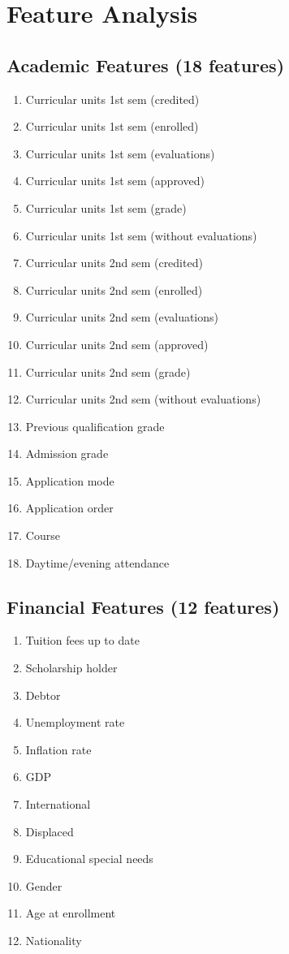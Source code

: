 \section{Feature Analysis}
\label{sec:feature_analysis}

\subsection{Academic Features (18 features)}

\begin{enumerate}
    \item Curricular units 1st sem (credited)
    \item Curricular units 1st sem (enrolled)
    \item Curricular units 1st sem (evaluations)
    \item Curricular units 1st sem (approved)
    \item Curricular units 1st sem (grade)
    \item Curricular units 1st sem (without evaluations)
    \item Curricular units 2nd sem (credited)
    \item Curricular units 2nd sem (enrolled)
    \item Curricular units 2nd sem (evaluations)
    \item Curricular units 2nd sem (approved)
    \item Curricular units 2nd sem (grade)
    \item Curricular units 2nd sem (without evaluations)
    \item Previous qualification grade
    \item Admission grade
    \item Application mode
    \item Application order
    \item Course
    \item Daytime/evening attendance
\end{enumerate}

\subsection{Financial Features (12 features)}

\begin{enumerate}
    \item Tuition fees up to date
    \item Scholarship holder
    \item Debtor
    \item Unemployment rate
    \item Inflation rate
    \item GDP
    \item International
    \item Displaced
    \item Educational special needs
    \item Gender
    \item Age at enrollment
    \item Nationality
\end{enumerate}

